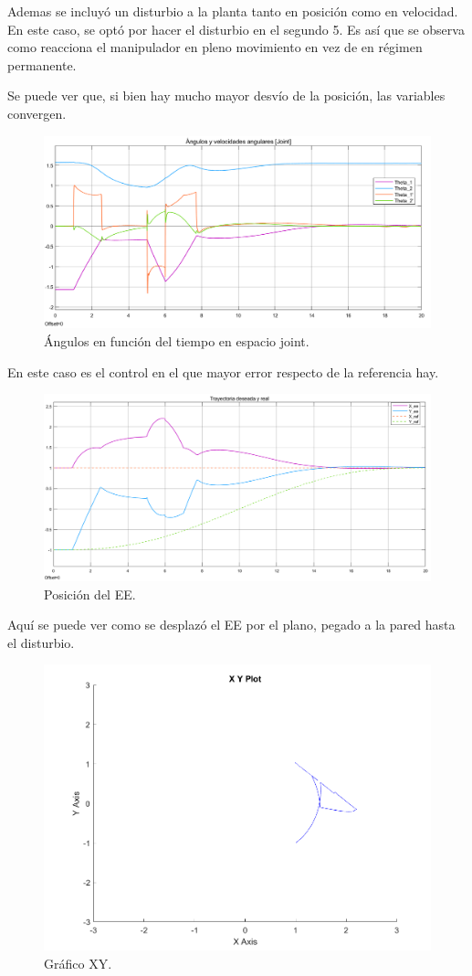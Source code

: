 Ademas se incluyó un disturbio a la planta tanto en posición como en velocidad. En este caso, se optó por hacer el disturbio en el segundo 5. Es así que se observa como reacciona el manipulador en pleno movimiento en vez de en régimen permanente.

Se puede ver que, si bien hay mucho mayor desvío de la posición, las variables convergen. 

\begin{figure}[H]
	\centering
	\includegraphics[width=0.8\linewidth]{ImagenesControl híbrido no lineal/3_3_f_a}
	\caption{Ángulos en función del tiempo en espacio joint.}	
	\label{fig:cthetasd}
\end{figure}

En este caso es el control en el que mayor error respecto de la referencia hay.

\begin{figure}[H]
	\centering
	\includegraphics[width=0.8\linewidth]{ImagenesControl híbrido no lineal/3_3_f_b}
	\caption{Posición del EE.}	
	\label{fig:cposd}
\end{figure}

Aquí se puede ver como se desplazó el EE por el plano, pegado a la pared hasta el disturbio.
\begin{figure}[H]
	\centering
	\includegraphics[width=0.5\linewidth]{ImagenesControl híbrido no lineal/3_3_f_c}
	\caption{Gráfico XY.}	
	\label{fig:cxyd}
\end{figure}

